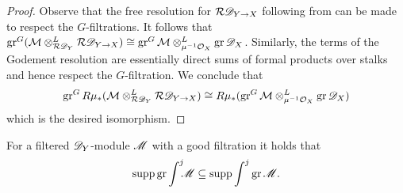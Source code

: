 \begin{proof}
  Observe that the free resolution for $\mathcal{R} \mathscr{D}_{Y\to X}$ following from  can be made to respect the $G$-filtrations.
  It follows that $\operatorname{gr}^G(\mathcal{M}\otimes^L_{\mathcal{R}\mathscr{D}_Y} \mathcal{R}\mathscr{D}_{Y\to X}) \cong \operatorname{gr}^G\mathcal{M}\otimes^L_{\mu^{-1}\mathcal{O}_X}\operatorname{gr}\mathscr{D}_X$.
  Similarly, the terms of the Godement resolution are essentially direct sums of formal products over stalks and hence respect the $G$-filtration.
  We conclude that
   $$\operatorname{gr}^GR\mu_*(\mathcal{M}\otimes^L_{\mathcal{R}\mathscr{D}_Y} \mathcal{R}\mathscr{D}_{Y\to X})  \cong R\mu_*(\operatorname{gr}^G\mathcal{M}\otimes^L_{\mu^{-1}\mathcal{O}_X}\operatorname{gr}\mathscr{D}_X)$$
  which is the desired isomorphism.


\end{proof}
\begin{proposition}\label{prop: SuppGrrelIntInclusion}
  For a filtered $\mathscr{D}_Y$-module $\mathscr{M}$ with a good filtration it holds that  $$\operatorname{supp} \operatorname{gr}\int^j \mkern -8mu\mathscr{M} \subseteq \operatorname{supp} \int^j \operatorname{gr}\mathscr{M}.$$
\end{proposition}
